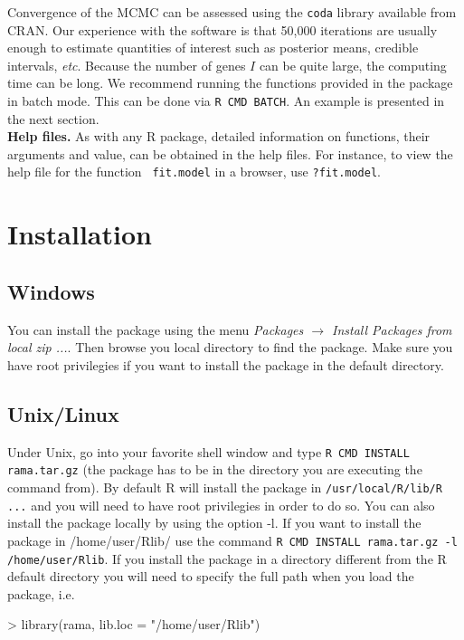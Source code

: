 \documentclass[11pt]{article}
\begin{document}
Convergence of the  MCMC can be assessed using the {\tt coda} library available from CRAN. 
Our experience with the software is that 50,000 iterations are 
usually enough to estimate quantities of interest such as posterior means, credible intervals, \textit{etc}. 
Because the number of genes $I$ can be quite large, the computing time can be long. 
We recommend running the functions provided in the package in batch mode. This can be done via {\tt R CMD BATCH}. An example is
presented in the next section. \\


{\bf Help files.}  As with any R package, detailed information on
functions, their arguments and value, can be obtained in the help
files. For instance, to view the help file for the function {\tt
  fit.model} in a browser, use {\tt ?fit.model}. 

\section{Installation}
\subsection{Windows}
You can install the package using the menu \textit{Packages $\rightarrow$ Install Packages from local zip ...}.
Then browse you local directory to find the package. Make sure you have root privilegies if you want to install 
the package in the default directory. 
\subsection{Unix/Linux}
Under Unix, go into your favorite shell window and type 
{\tt R CMD INSTALL rama.tar.gz} (the package has to be in the directory you are executing the command from).  
By default R will install the package in {\tt /usr/local/R/lib/R ...} and you will need to have root privilegies in order to do so. 
You can also install the package locally by using the option -l. If you want to install the package in /home/user/Rlib/
use the command {\tt R CMD INSTALL rama.tar.gz -l /home/user/Rlib}. If you install the package in a directory different from the 
R default directory you will need to specify the full path when you load the package, i.e. 

\begin{Schunk}
\begin{Sinput}
> library(rama, lib.loc = "/home/user/Rlib")
\end{Sinput}
\end{Schunk}
\end{document}
